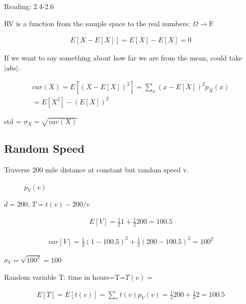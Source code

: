 
 Reading: 2.4-2.6

RV is a function from the sample space to the real numbers: $\Omega \rightarrow \mathbb{R}$


\begin{align*}
E[X-E[X]] = E[X] - E[X] = 0
\end{align*}

If we want to say something about how far we are from the mean, could take $|abs|$.

\begin{align}
var(X)=E[(X-E[X])^2] = \sum_x(x - E[X])^2 p_X(x)\\
= E[X^2] -(E[X])^2
\end{align}

std = $\sigma_X = \sqrt{var(X)}$

\subsection{Random Speed}


Traverse 200 mile distance at constant but random speed v.


\begin{figure}[h]
\caption{$p_V(v)$}
\end{figure}

$d=200$, $T=t(v)-200/v$

\begin{align*}
E[V] = \frac{1}{2}1 + \frac{1}{2}200 = 100.5
\end{align*}

\begin{align*}
var[V] = \frac{1}{2}(1-100.5)^2 + \frac{1}{2}(200 -100.5)^2 = 100^2
\end{align*}

$\sigma_V = \sqrt{100^2}=100$


Random variable T: time in hours=T=$T(v)=$

\begin{align*}
E[T] = E[t(v)] = \sum_v t(v)p_V(v) = \frac{1}{2}200 + \frac{1}{2}2 = 100.5
\end{align*}

